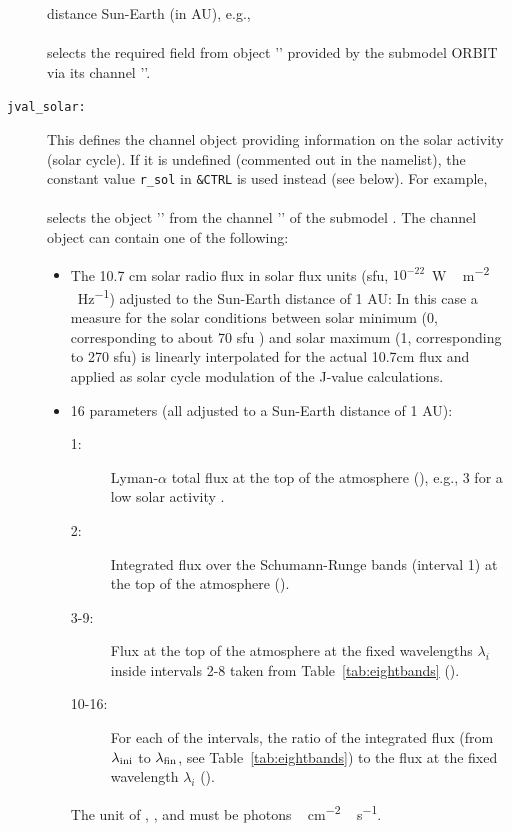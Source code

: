 \documentclass[a4paper,twoside]{article}
\begin{document}
\begin{description}
  distance Sun-Earth (in AU), e.g.,\\
  \\
  selects the required field from object '' provided by the
  submodel ORBIT via its channel ''.
\item[\tt jval\_solar:] This defines the channel object providing
  information on the solar activity (solar cycle). If it is undefined
  (commented out in the namelist), the constant value {\tt r\_sol} in
  \verb|&CTRL| is used instead (see below). For example,\\
  \\
  selects the object '' from the channel ''
  of the submodel . The channel object can contain one
  of the following:
  \begin{itemize}
  \item The 10.7 cm solar radio flux in solar flux units (sfu,
    $10^{-22}$~\unit{W\,m^{−2}\,Hz^{−1}}) adjusted to the Sun-Earth
    distance of 1 AU: In this case a measure for the solar conditions
    between solar minimum (0, corresponding to about 70 sfu
    \citep{3016}) and solar maximum (1, corresponding to 270 sfu) is
    linearly interpolated for the actual 10.7cm flux and applied as
    solar cycle modulation of the J-value calculations.
  \item 16 parameters (all adjusted to a Sun-Earth distance of 1 AU):
    \begin{description}
    \item[1:] Lyman-$\alpha$ total flux at the top of the atmosphere
      (), e.g., 3 for a low solar activity
      \citep{2633}.
    \item[2:] Integrated flux over the Schumann-Runge bands (interval 1)
      at the top of the atmosphere ().
    \item[3-9:] Flux at the top of the atmosphere at the fixed
      wavelengths $\lambda_i$ inside intervals 2-8 taken from
      Table~\ref{tab:eightbands} ().
    \item[10-16:] For each of the intervals, the ratio of the integrated
      flux (from $\lambda_{\rm ini}$ to $\lambda_{\rm fin}$, see
      Table~\ref{tab:eightbands}) to the flux at the fixed wavelength
      $\lambda_i$ ().
    \end{description}
    The unit of , , and  must
    be \unit{\mbox{photons}\,cm^{-2}\,s^{-1}}.
  \end{itemize}

\end{description}
\end{document}
